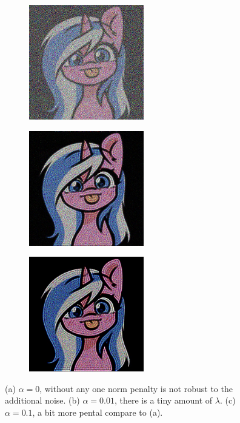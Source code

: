 \documentclass[]{article}
\theoremstyle{definition}
\begin{document}
        \begin{figure}[H]
            \centering
            \begin{subfigure}{0.31\textwidth}
                \includegraphics[width=5cm]{inverse_linear_experiment1-soln_img.jpg}
                \caption{} \label{fig:1a}
            \end{subfigure}     %
            \hspace*{\fill}     %
            \begin{subfigure}{0.31\textwidth}
                \includegraphics[width=5cm]{inverse_linear_experiment2-soln_img.jpg}
                \caption{} \label{fig:1b}
            \end{subfigure}     %
            \hspace*{\fill}     %
            \begin{subfigure}{0.31\textwidth}
                \includegraphics[width=5cm]{inverse_linear_experiment3-soln_img.jpg}
                \caption{} \label{fig:1c}
            \end{subfigure}
            \caption{(a) $\alpha = 0$, without any one norm penalty is not robust to the additional noise. (b) $\alpha = 0.01$, there is a tiny amount of $\lambda$. (c) $\alpha = 0.1$, a bit more pental compare to (a).}
            \label{fig:alto_deblurred}
        \end{figure}
\end{document}
